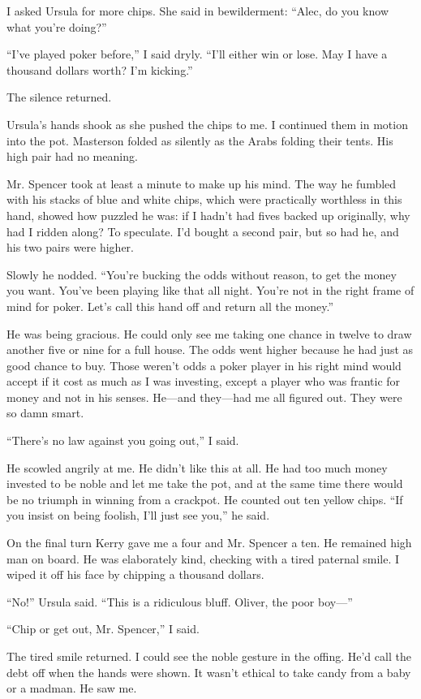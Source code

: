 \documentclass{novel}
\begin{document}
I asked Ursula for more chips. She said in bewilderment: “Alec, do you know what you’re doing?”

“I’ve played poker before,” I said dryly. “I’ll either win or lose. May I have a thousand dollars worth? I’m kicking.”

The silence returned. 

Ursula’s hands shook as she pushed the chips to me. I continued them in motion into the pot. Masterson folded as silently as the Arabs folding their tents. His high pair had no meaning.

Mr. Spencer took at least a minute to make up his mind. The way he fumbled with his stacks of blue and white chips, which were practically worthless in this hand, showed how puzzled he was: if I hadn’t had fives backed up originally, why had I ridden along? To speculate. I’d bought a second pair, but so had he, and his two pairs were higher.

Slowly he nodded. “You’re bucking the odds without reason, to get the money you want. You’ve been playing like that all night. You’re not in the right frame of mind for poker. Let’s call this hand off and return all the money.”

He was being gracious. He could only see me taking one chance in twelve to draw another five or nine for a full house. The odds went higher because he had just as good chance to buy. Those weren’t odds a poker player in his right mind would accept if it cost as much as I was investing, except a player who was frantic for money and not in his senses. He—and they—had me all figured out. They were so damn smart.

“There’s no law against you going out,” I said.

He scowled angrily at me. He didn’t like this at all. He had too much money invested to be noble and let me take the pot, and at the same time there would be no triumph in winning from a crackpot. He counted out ten yellow chips. “If you insist on being foolish, I’ll just see you,” he said.

On the final turn Kerry gave me a four and Mr. Spencer a ten. He remained high man on board. He was elaborately kind, checking with a tired paternal smile. I wiped it off his face by chipping a thousand dollars.

“No!” Ursula said. “This is a ridiculous bluff. Oliver, the poor boy—”

“Chip or get out, Mr. Spencer,” I said.

The tired smile returned. I could see the noble gesture in the offing. He’d call the debt off when the hands were shown. It wasn’t ethical to take candy from a baby or a madman. He saw me.
\end{document}
